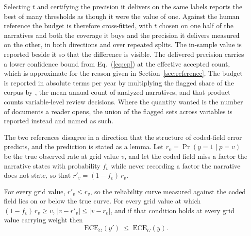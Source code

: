 Selecting $t$ and certifying the precision it delivers on the same labels reports the best of
many thresholds as though it were the value of one. Against the human reference the budget is
therefore cross-fitted, with $t$ chosen on one half of the narratives and both the coverage it
buys and the precision it delivers measured on the other, in both directions and over repeated
splits. The in-sample value is reported beside it so that the difference is visible. The
delivered precision carries a lower confidence bound from Eq.~(\ref{eq:cp}) at the effective
accepted count, which is approximate for the reason given in Section~\ref{sec:reference}. The
budget is reported in absolute terms per year by multiplying the flagged share of the corpus by
\TexasPerYear{}, the mean annual count of analyzed narratives, and that product counts
variable-level review decisions. Where the quantity wanted is the number of documents a reader
opens, the union of the flagged sets across variables is reported instead and named as such.

The two references disagree in a direction that the structure of coded-field error predicts,
and the prediction is stated as a lemma. Let $r_v = \Pr(y = 1 \mid p = v)$ be the true
observed rate at grid value $v$, and let the coded field miss a factor the narrative states
with probability $f_v$ while never recording a factor the narrative does not state, so that
$r'_v = (1 - f_v)\,r_v$.

\begin{lemma}
\label{lem:noise}
For every grid value, $r'_v \le r_v$, so the reliability curve measured against the coded
field lies on or below the true curve. For every grid value at which
$(1 - f_v)\,r_v \ge v$, $|v - r'_v| \le |v - r_v|$, and if that condition holds at every
grid value carrying weight then
\begin{equation}
\mathrm{ECE}_G(y') \;\le\; \mathrm{ECE}_G(y).
\label{eq:noise}
\end{equation}
\end{lemma}

